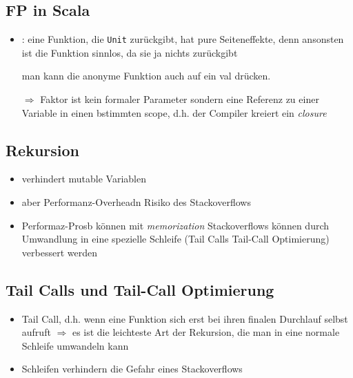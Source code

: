 \subsection{FP in Scala}
\begin{itemize}
  \item {}: eine Funktion, die \texttt{Unit} zurückgibt,
  hat pure Seiteneffekte, denn ansonsten ist die Funktion sinnlos,
  da sie ja nichts zurückgibt
  
  
  
  man kann die anonyme Funktion auch auf ein val drücken.
  
  
  
  $\Rightarrow$ Faktor ist kein formaler Parameter sondern eine
  Referenz zu einer Variable in einen bstimmten scope, d.h. 
  der Compiler kreiert ein \textit{closure}
\end{itemize}


\subsection{Rekursion}
\begin{itemize}
  \item verhindert mutable Variablen
  \item aber Performanz-Overheadn \und Risiko des Stackoverflows
  \item Performaz-Prosb können mit \textit{memorization} \und 
  Stackoverflows können durch Umwandlung in eine spezielle 
  Schleife (Tail Calls \und Tail-Call Optimierung) verbessert
  werden
\end{itemize}


\subsection{Tail Calls und Tail-Call Optimierung}
\begin{itemize}
  \item Tail Call, d.h. wenn eine Funktion sich erst bei ihren
  finalen Durchlauf selbst aufruft $\Rightarrow$ es ist die leichteste
  Art der Rekursion, die man in eine normale Schleife umwandeln kann
  \item Schleifen verhindern die Gefahr eines Stackoverflows
  
  
\end{itemize}


